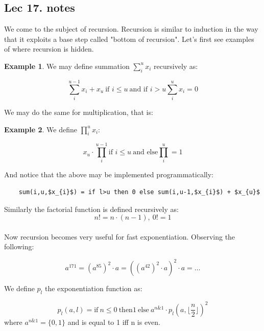 \documentclass[titlepage]{article}
\theoremstyle{definition}
\newcommand{\floor}[1]{\lfloor #1 \rfloor}
\newtheorem{example}{Example}
\numberwithin{equation}{subsection}
\numberwithin{remark}{subsection}
\begin{document}
\subsection{Lec 17. notes}
We come to the subject of recursion. Recursion is similar to induction in the way that it exploits a base step called "bottom of recursion". Let's first see examples of where recursion is hidden. 

\begin{example}
We may define summation $\sum_{i}^{u} x_{i}$ recursively as:

$$ \sum_{i}^{u-1} x_{i} + x_{u} \ \text{if $i \leq u$} \ \text{and if $i > u$} \sum_{i}^{u} x_{i} = 0$$
\end{example}

We may do the same for multiplication, that is:

\begin{example}
We define $\prod_{i}^{u} x_{i} $: 

$$ x_{u} \cdot \prod_{i}^{u-1}  \text{if $i\leq u$} \ \text{and else} \prod_{i}^{u} = 1$$
\end{example}

And notice that the above may be implemented programmatically:

\begin{lstlisting}
    sum(i,u,$x_{i}$) = if l>u then 0 else sum(i,u-1,$x_{i}$) + $x_{u}$
\end{lstlisting}

Similarly the factorial function is defined recursively as:
$$n! = n \cdot (n-1), \ 0!=1$$
\\

Now recursion becomes very useful for fast exponentiation. Observing the following:

$$ a^{171} = (a^{85})^{2} \cdot a = ((a^{42})^{2}\cdot a)^{2} \cdot a = \ldots$$

We define $p_{l}$ the exponentiation function as:

$$ p_{l}(a,l) = \text{if} \ n\leq 0 \ \text{then} 1\ \text{else} \ a^{n\text{&}1}\cdot p_{l}(a,\floor{\frac{n}{2}})^{2}$$ where $a^{n\text{&}1} = \{0,1\}$ and is equal to 1 iff n is even. 
\end{document}
